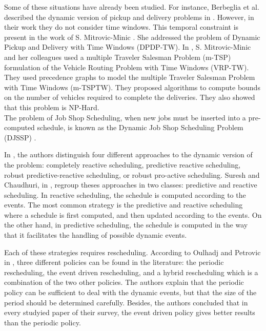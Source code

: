 \documentclass[a4paper,10pt]{article}
\begin{document}
Some of these situations have already been studied. For instance, Berbeglia et al. described the dynamic version of pickup and delivery problems in \cite{Berbeglia2010}. However, in their work they do not consider time windows. This temporal constraint is present in the work of S. Mitrovic-Minic \cite{Mitrovic2001}. She addressed the problem of Dynamic Pickup and Delivery with Time Windows (DPDP-TW). In \cite{Mitrovic2006}, S. Mitrovic-Minic and her colleagues used a multiple Traveler Salesman Problem (m-TSP) formulation of the Vehicle Routing Problem with Time Windows (VRP-TW). They used precedence graphs to model the multiple Traveler Salesman Problem with Time Windows (m-TSPTW). They proposed algorithms to compute bounds on the number of vehicles required to complete the deliveries. They also showed that this problem is NP-Hard.\\

The problem of Job Shop Scheduling, when new jobs must be inserted into a pre-computed schedule, is known as the Dynamic Job Shop Scheduling Problem (DJSSP) \cite{Ramasesh1990}.

In \cite{Ouelhadj2009}, the authors distinguish four different approaches to the dynamic version of the problem: completely reactive scheduling, predictive reactive scheduling, robust predictive-reactive scheduling, or robust pro-active scheduling. Suresh and Chaudhuri, in \cite{Suresh1993}, regroup theses approaches in two classes: predictive and reactive scheduling. In reactive scheduling, the schedule is computed according to the events. The most common strategy is the predictive and reactive scheduling where a schedule is first computed, and then updated according to the events. On the other hand, in predictive scheduling, the schedule is computed in the way that it facilitates the handling of possible dynamic events.

Each of these strategies requires rescheduling. According to Oulhadj and Petrovic in \cite{Ouelhadj2009}, three different policies can be found in the literature: the periodic rescheduling, the event driven rescheduling, and a hybrid rescheduling which is a combination of the two other policies. The authors explain that the periodic policy can be sufficient to deal with the dynamic events, but that the size of the period should be determined carefully. Besides, the authors concluded that in every studyied paper of their survey, the event driven policy gives better results than the periodic policy.
\end{document}
